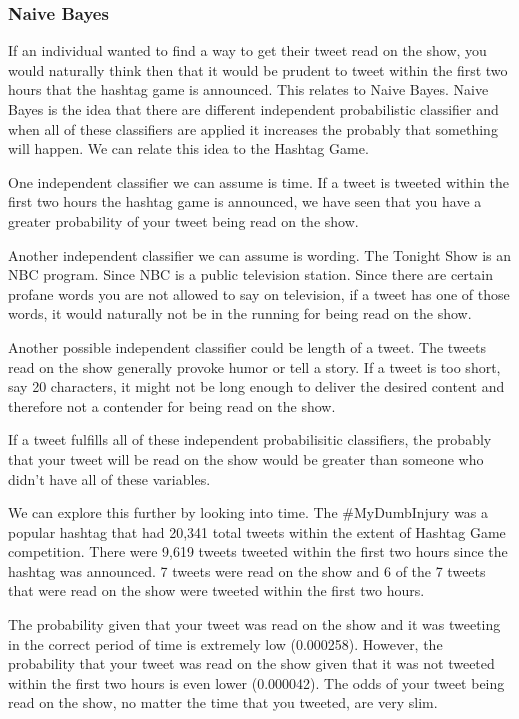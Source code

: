 \documentclass[titlepage]{article}
\begin{document}
\subsubsection{Naive Bayes}

If an individual wanted to find a way to get their tweet read on the show, you would naturally think then that it would be prudent to tweet within the first two hours that the hashtag game is announced. This relates to Naive Bayes. Naive Bayes is the idea that there are different independent probabilistic classifier and when all of these classifiers are applied it increases the probably that something will happen. We can relate this idea to the Hashtag Game. 

One independent classifier we can assume is time. If a tweet is tweeted within the first two hours the hashtag game is announced, we have seen that you have a greater probability of your tweet being read on the show. 

Another independent classifier we can assume is wording. The Tonight Show is an NBC program. Since NBC is a public television station. Since there are certain profane words you are not allowed to say on television, if a tweet has one of those words, it would naturally not be in the running for being read on the show. 

Another possible independent classifier could be length of a tweet. The tweets read on the show generally provoke humor or tell a story. If a tweet is too short, say 20 characters, it might not be long enough to deliver the desired content and therefore not a contender for being read on the show.

If a tweet fulfills all of these independent probabilisitic classifiers, the probably that your tweet will be read on the show would be greater than someone who didn't have all of these variables.

We can explore this further by looking into time. The \#MyDumbInjury was a popular hashtag that had 20,341 total tweets within the extent of Hashtag Game competition. There were 9,619 tweets tweeted within the first two hours since the hashtag was announced. 7 tweets were read on the show and 6 of the 7 tweets that were read on the show were tweeted within the first two hours. 

The probability given that your tweet was read on the show and it was tweeting in the correct period of time is extremely low (0.000258). However, the probability that your tweet was read on the show given that it was not tweeted within the first two hours is even lower (0.000042). The odds of your tweet being read on the show, no matter the time that you tweeted, are very slim.
\end{document}
